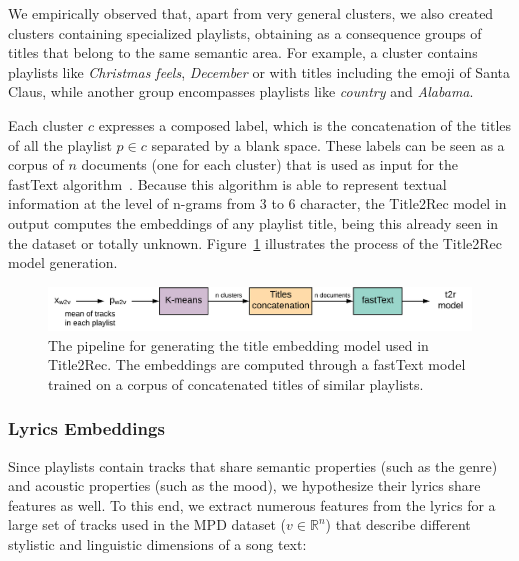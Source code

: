 We empirically observed that, apart from very general clusters, we also created clusters containing specialized playlists, obtaining as a consequence groups of titles that belong to the same semantic area. For example, a cluster contains playlists like \textit{Christmas feels}, \textit{December} or with titles including the emoji of Santa Claus, while another group encompasses playlists like \textit{country} and \textit{Alabama}.

Each cluster $c$ expresses a composed label, which is the concatenation of the titles of all the playlist $p \in c$ separated by a blank space. These labels can be seen as a corpus of $n$ documents (one for each cluster) that is used as input for the fastText algorithm~\cite{Joulin2016}. Because this algorithm is able to represent textual information at the level of n-grams from 3 to 6 character, the Title2Rec model in output computes the embeddings of any playlist title, being this already seen in the dataset or totally unknown. Figure~\ref{rnn:fig:t2r_pipeline} illustrates the process of the Title2Rec model generation.

\begin{figure}
\centering
\includegraphics[width=\textwidth]{t2r}
\caption[Pipeline for the title embedding model]{The pipeline for generating the title embedding model used in Title2Rec. The embeddings are computed through a fastText model trained on a corpus of concatenated titles of similar playlists.}
\label{rnn:fig:t2r_pipeline}
\end{figure}

\subsubsection{Lyrics Embeddings}
\label{rnn:sec:lyrics}

Since playlists contain tracks that share semantic properties (such as the genre) and acoustic properties (such as the mood), we hypothesize their lyrics share features as well. To this end, we extract numerous features from the lyrics for a large set of tracks used in the MPD dataset ($v \in \mathbb{R}^{n}$) that describe different stylistic and linguistic dimensions of a song text:

